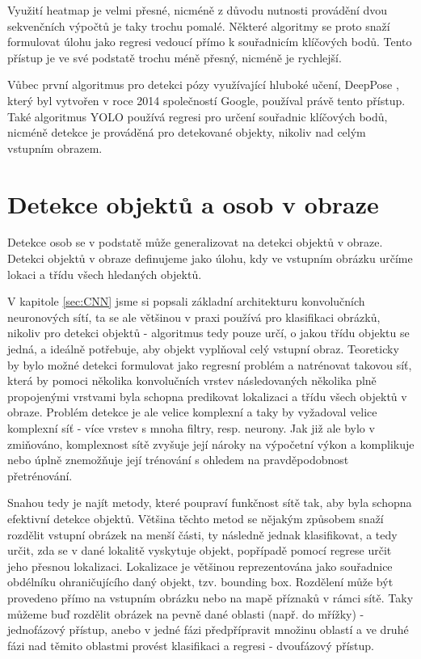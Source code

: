 Využití heatmap je velmi přesné, nicméně z důvodu nutnosti provádění dvou
sekvenčních výpočtů je taky trochu pomalé. Některé algoritmy se proto snaží
formulovat úlohu jako regresi vedoucí přímo k souřadnicím klíčových bodů. Tento
přístup je ve své podstatě trochu méně přesný, nicméně je rychlejší.

Vůbec první algoritmus pro detekci pózy využívající hluboké učení, DeepPose
\cite{deeppose}, který byl vytvořen v roce 2014 společností Google, používal
právě tento přístup. Také algoritmus YOLO používá regresi pro určení souřadnic
klíčových bodů, nicméně detekce je prováděná pro detekované objekty, nikoliv
nad celým vstupním obrazem. \cite{yolo-pose}


\section{Detekce objektů a osob v obraze}

Detekce osob se v podstatě může generalizovat na detekci objektů v obraze.
Detekci objektů v obraze definujeme jako úlohu, kdy ve vstupním obrázku určíme
lokaci a třídu všech hledaných objektů.

V kapitole \ref{sec:CNN} jsme si popsali základní architekturu konvolučních
neuronových sítí, ta se ale většinou v praxi používá pro klasifikaci obrázků,
nikoliv pro detekci objektů - algoritmus tedy pouze určí, o jakou třídu objektu
se jedná, a ideálně potřebuje, aby objekt vyplňoval celý vstupní obraz.
Teoreticky by bylo možné detekci formulovat jako regresní problém a natrénovat
takovou síť, která by pomoci několika konvolučních vrstev následovaných
několika plně propojenými vrstvami byla schopna predikovat lokalizaci a třídu
všech objektů v obraze. \cite{szegedy} Problém detekce je ale velice komplexní
a taky by vyžadoval velice komplexní síť - více vrstev s mnoha filtry, resp.
neurony. Jak již ale bylo v zmiňováno, komplexnost sítě zvyšuje její nároky na
výpočetní výkon a komplikuje nebo úplně znemožňuje její trénování s ohledem na
pravděpodobnost přetrénování.

Snahou tedy je najít metody, které poupraví funkčnost sítě tak, aby byla
schopna efektivní detekce objektů. Většina těchto metod se nějakým způsobem
snaží rozdělit vstupní obrázek na menší části, ty následně jednak klasifikovat,
a tedy určit, zda se v dané lokalitě vyskytuje objekt, popřípadě pomocí regrese
určit jeho přesnou lokalizaci. Lokalizace je většinou reprezentována jako
souřadnice obdélníku ohraničujícího daný objekt, tzv. bounding box. Rozdělení
může být provedeno přímo na vstupním obrázku nebo na mapě příznaků v rámci
sítě. Taky můžeme buď rozdělit obrázek na pevně dané oblasti (např. do mřížky)
- jednofázový přístup, anebo v jedné fázi předpřípravit množinu oblastí a ve
druhé fázi nad těmito oblastmi provést klasifikaci a regresi - dvoufázový
přístup.

